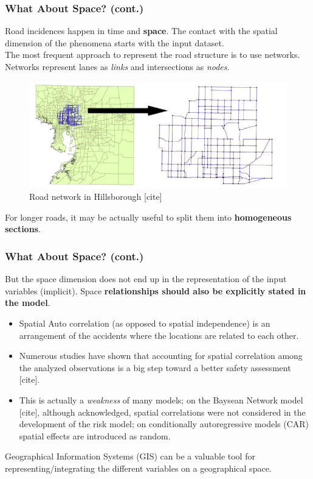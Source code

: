 \documentclass[hyperref={pdfpagelabels=true}]{beamer}
\begin{document}
\begin{frame}
\frametitle{What About Space? (cont.)}
Road incidences happen in time and \textbf{space}. The contact with the spatial dimension of the phenomena starts with the input dataset.\\
The most frequent approach to represent the road structure is to use networks. Networks represent lanes as \textit{links} and intersections as \textit{nodes}.
\begin{figure}
\includegraphics[scale=0.40]{road_network.png}
\caption{\tiny{Road network in  Hillsborough [cite]}}
\end{figure}
For longer roads, it may be actually useful to split them into \textbf{homogeneous sections}. %
\end{frame}

\begin{frame}
\frametitle{What About Space? (cont.)}
But the space dimension does not end up in the representation of the input variables (implicit). Space \textbf{relationships should also be explicitly stated in the model}.
\begin{itemize}
\item Spatial Auto correlation (as opposed to spatial independence) is an arrangement of the accidents where the locations are related to each other.
\item Numerous studies have shown that accounting for spatial correlation among the analyzed observations is a big step toward a better safety assessment [cite].
\item This is actually a \textit{weakness} of many models; on the Baysean Network model [cite], although acknowledged, spatial correlations were not considered in the development of the risk model; on conditionally autoregressive models (CAR) spatial effects are introduced as random.
\end{itemize}
Geographical Information Systems (GIS) can be a valuable tool for representing/integrating the different variables on a geographical space.
\end{frame}
\end{document}

